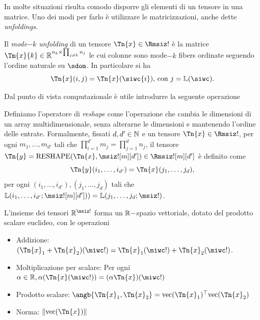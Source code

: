 In molte situazioni risulta comodo disporre gli elementi di un tensore in una matrice. Uno dei modi
per farlo è utilizzare le matricizzazioni, anche dette \emph{unfoldings}.

\begin{definition}
  Il \emph{mode$-k$ unfolding} di un tensore $ \Tn{x} \in \Rmsiz! $ è la matrice $ \Tm{x}{k} \in \R^{n_k \times
  \prod_{j\neq k}n_j} $ le cui colonne sono mode$ -k $ fibers ordinate seguendo l'ordine naturale
  su $ \sdom $. In particolare si ha
  \[
  \Tn{x}(i,j) = \Tn{x}(\siwc{i}) \text{, con } j = \L(\siwc)
  .\] 
\end{definition}


Dal punto di vista computazionale è utile introdurre la seguente operazione

\begin{definition}[Reshape]
  Definiamo l'operatore di \emph{reshape} come l'operazione che cambia le dimensioni di un array
  multidimensionale, senza alterarne le dimensioni e mantenendo l'ordine delle entrate. Formalmente,
  fissati $ d, d' \in \mathbb{N}$ e un tensore $ \Tn{x} \in \Rmsiz! $, per ogni $ m_1, \ldots, m_{d'} $ tali
  che $ \prod_{i=1}^{d'} m_j = \prod_{j = 1}^{d} n_j$, il tensore $ \Tn{y} = \reshape(\Tn{x},
  \msiz![m][d']) \in \Rmsiz![m][d'] $ è definito come
  \[
  \Tn{y}(i_1, \ldots, i_{d'})= \Tn{x}(j_1, \ldots, j_d) 
,\] 
 per ogni $(i_1, \ldots, i_{d'}),(j_1, \ldots,
  j_d) $ tali che $ \L(i_1, \ldots, i_{d'}; \msiz![m][d'])) = \L(j_1, \ldots,
  j_d; \msiz!)$.
\end{definition}

\begin{remark}
  L'insieme dei tensori $ \R^{\msiz!} $ forma un $ \mathbb{R}- $spazio vettoriale, dotato del prodotto
  scalare euclideo, con le operazioni
  \begin{itemize}
    \item Addizione: $(\Tn{x}_1 + \Tn{x}_2)(\miwc!) = \Tn{x}_1(\miwc!) + \Tn{x}_2(\miwc!)$.
    \item Moltiplicazione per scalare: Per ogni $ \alpha \in \R, \alpha (\Tn{x}(\miwc!)) = (\alpha
      \Tn{x})(\miwc!)$
    \item Prodotto scalare: $ \angb{\Tn{x}_1, \Tn{x}_2} = \vec(\Tn{x}_1)^{\top} \vec(\Tn{x}_2)$
    \item Norma: $\| \vec(\Tn{x})\|$
  \end{itemize}
\end{remark}


